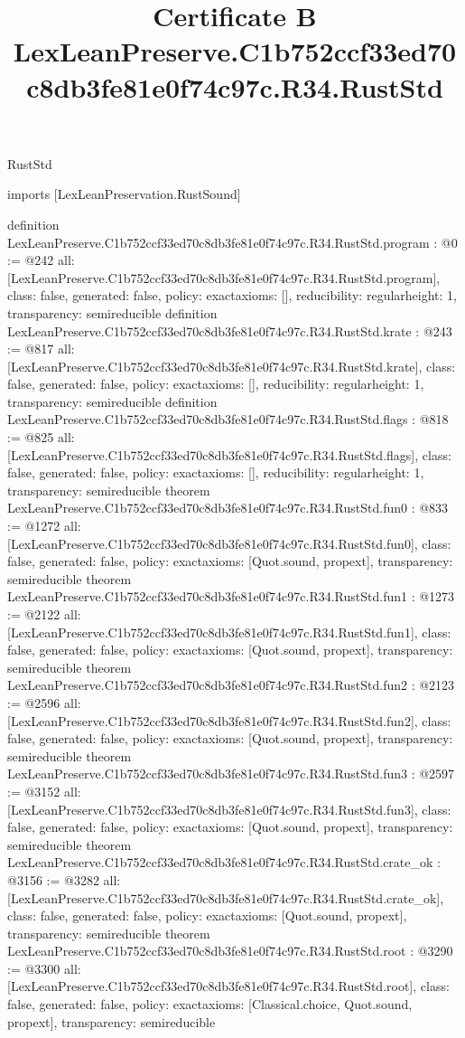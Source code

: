 \begin{lexlean}{RustStd}
\title{Certificate B LexLeanPreserve.C1b752ccf33ed70c8db3fe81e0f74c97c.R34.RustStd}
\begin{coremodule}
imports [LexLeanPreservation.RustSound]

definition LexLeanPreserve.C1b752ccf33ed70c8db3fe81e0f74c97c.R34.RustStd.program : @0 := @242 {
  all: [LexLeanPreserve.C1b752ccf33ed70c8db3fe81e0f74c97c.R34.RustStd.program],
  class: false,
  generated: false,
  policy: exact{axioms: []},
  reducibility: regular{height: 1},
  transparency: semireducible
}
definition LexLeanPreserve.C1b752ccf33ed70c8db3fe81e0f74c97c.R34.RustStd.krate : @243 := @817 {
  all: [LexLeanPreserve.C1b752ccf33ed70c8db3fe81e0f74c97c.R34.RustStd.krate],
  class: false,
  generated: false,
  policy: exact{axioms: []},
  reducibility: regular{height: 1},
  transparency: semireducible
}
definition LexLeanPreserve.C1b752ccf33ed70c8db3fe81e0f74c97c.R34.RustStd.flags : @818 := @825 {
  all: [LexLeanPreserve.C1b752ccf33ed70c8db3fe81e0f74c97c.R34.RustStd.flags],
  class: false,
  generated: false,
  policy: exact{axioms: []},
  reducibility: regular{height: 1},
  transparency: semireducible
}
theorem LexLeanPreserve.C1b752ccf33ed70c8db3fe81e0f74c97c.R34.RustStd.fun0 : @833 := @1272 {
  all: [LexLeanPreserve.C1b752ccf33ed70c8db3fe81e0f74c97c.R34.RustStd.fun0],
  class: false,
  generated: false,
  policy: exact{axioms: [Quot.sound, propext]},
  transparency: semireducible
}
theorem LexLeanPreserve.C1b752ccf33ed70c8db3fe81e0f74c97c.R34.RustStd.fun1 : @1273 := @2122 {
  all: [LexLeanPreserve.C1b752ccf33ed70c8db3fe81e0f74c97c.R34.RustStd.fun1],
  class: false,
  generated: false,
  policy: exact{axioms: [Quot.sound, propext]},
  transparency: semireducible
}
theorem LexLeanPreserve.C1b752ccf33ed70c8db3fe81e0f74c97c.R34.RustStd.fun2 : @2123 := @2596 {
  all: [LexLeanPreserve.C1b752ccf33ed70c8db3fe81e0f74c97c.R34.RustStd.fun2],
  class: false,
  generated: false,
  policy: exact{axioms: [Quot.sound, propext]},
  transparency: semireducible
}
theorem LexLeanPreserve.C1b752ccf33ed70c8db3fe81e0f74c97c.R34.RustStd.fun3 : @2597 := @3152 {
  all: [LexLeanPreserve.C1b752ccf33ed70c8db3fe81e0f74c97c.R34.RustStd.fun3],
  class: false,
  generated: false,
  policy: exact{axioms: [Quot.sound, propext]},
  transparency: semireducible
}
theorem LexLeanPreserve.C1b752ccf33ed70c8db3fe81e0f74c97c.R34.RustStd.crate_ok : @3156 := @3282 {
  all: [LexLeanPreserve.C1b752ccf33ed70c8db3fe81e0f74c97c.R34.RustStd.crate_ok],
  class: false,
  generated: false,
  policy: exact{axioms: [Quot.sound, propext]},
  transparency: semireducible
}
theorem LexLeanPreserve.C1b752ccf33ed70c8db3fe81e0f74c97c.R34.RustStd.root : @3290 := @3300 {
  all: [LexLeanPreserve.C1b752ccf33ed70c8db3fe81e0f74c97c.R34.RustStd.root],
  class: false,
  generated: false,
  policy: exact{axioms: [Classical.choice, Quot.sound, propext]},
  transparency: semireducible
}


\end{coremodule}
\end{lexlean}
